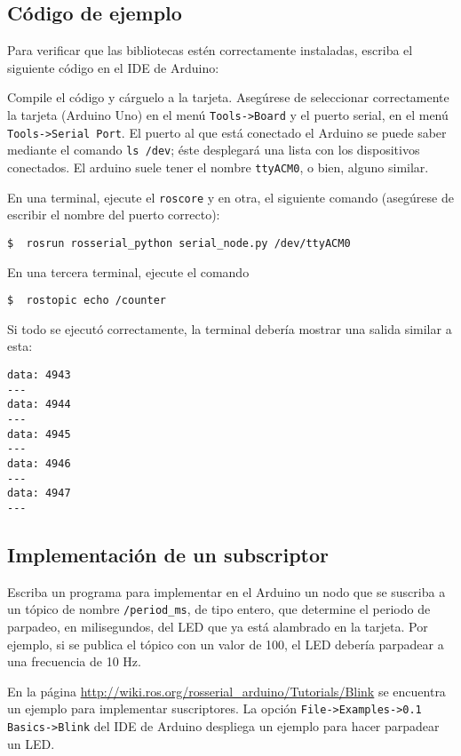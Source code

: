 \documentclass[letterpaper,12pt]{article}
\begin{document}
\subsection{Código de ejemplo}

Para verificar que las bibliotecas estén correctamente instaladas, escriba el siguiente código en el IDE de Arduino:


Compile el código y cárguelo a la tarjeta. Asegúrese de seleccionar correctamente la tarjeta (Arduino Uno) en el menú \texttt{Tools->Board} y el puerto serial, en el menú \texttt{Tools->Serial Port}. El puerto al que está conectado el Arduino se puede saber mediante el comando \texttt{ls /dev}; éste desplegará una lista con los dispositivos conectados. El arduino suele tener el nombre \texttt{ttyACM0}, o bien, alguno similar. 

En una terminal, ejecute el \texttt{roscore} y en otra, el siguiente comando (asegúrese de escribir el nombre del puerto correcto):
\begin{lstlisting}
$  rosrun rosserial_python serial_node.py /dev/ttyACM0
\end{lstlisting}

En una tercera terminal, ejecute el comando
\begin{lstlisting}
$  rostopic echo /counter
\end{lstlisting}

Si todo se ejecutó correctamente, la terminal debería mostrar una salida similar a esta:
\begin{verbatim}
data: 4943
---
data: 4944
---
data: 4945
---
data: 4946
---
data: 4947
---
\end{verbatim}

\subsection{Implementación de un subscriptor}
\label{sec:subscriber}

Escriba un programa para implementar en el Arduino un nodo que se suscriba a un tópico de nombre \texttt{/period\_ms}, de tipo entero, que determine el periodo de parpadeo, en milisegundos, del LED que ya está alambrado en la tarjeta. Por ejemplo, si se publica el tópico con un valor de 100, el LED debería parpadear a una frecuencia de 10 Hz. 

En la página \url{http://wiki.ros.org/rosserial_arduino/Tutorials/Blink} se encuentra un ejemplo para implementar suscriptores. La opción \texttt{File->Examples->0.1 Basics->Blink} del IDE de Arduino despliega un ejemplo para hacer parpadear un LED. 
\end{document}

